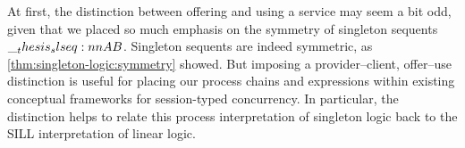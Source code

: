 

At first, the distinction between offering and using a service may seem a bit odd, given that we placed so much emphasis on the symmetry of singleton sequents $\slseq{A |- B}$.
Singleton sequents are indeed symmetric, as \cref{thm:singleton-logic:symmetry} showed.
But imposing a provider--client, offer--use distinction is useful for placing our process chains and expressions within existing conceptual frameworks for session-typed concurrency.
In particular, the distinction helps to relate this process interpretation of singleton logic back to the \ac{SILL} interpretation of linear logic\autocites{Caires+Pfenning:CONCUR10}{Caires+:TLDI12}{Caires+:MSCS16}{Toninho+:ESOP13}.






